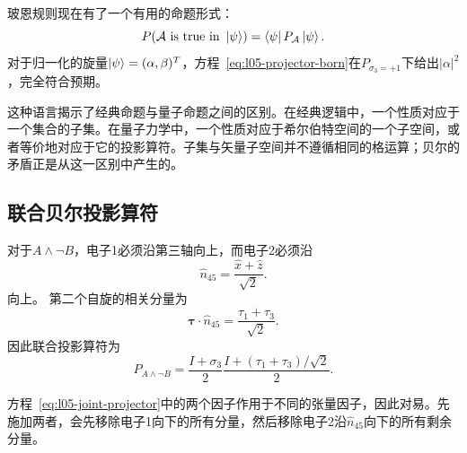 玻恩规则现在有了一个有用的命题形式：
\begin{equation}
  P(\mathcal A\text{ is true in }\left\lvert\psi\right\rangle)
  =
  \left\langle\psi\right\rvert P_{\mathcal A}\left\lvert\psi\right\rangle.
  \label{eq:l05-projector-born}
\end{equation}
对于归一化的旋量\(\left\lvert\psi\right\rangle=(\alpha,\beta)^T\)，方程~\eqref{eq:l05-projector-born}在\(P_{\sigma_3=+1}\)下给出\(|\alpha|^2\)，完全符合预期。

这种语言揭示了经典命题与量子命题之间的区别。在经典逻辑中，一个性质对应于一个集合的子集。在量子力学中，一个性质对应于希尔伯特空间的一个子空间，或者等价地对应于它的投影算符。子集与矢量子空间并不遵循相同的格运算；贝尔的矛盾正是从这一区别中产生的。

\subsection{联合贝尔投影算符}

对于\(A\wedge\neg B\)，电子1必须沿第三轴向上，而电子2必须沿
\begin{equation}
  \hat n_{45}=\frac{\hat x+\hat z}{\sqrt2}.
\end{equation}向上。
第二个自旋的相关分量为
\begin{equation}
  \boldsymbol{\tau}\cdot\hat n_{45}
  =
  \frac{\tau_1+\tau_3}{\sqrt2}.
\end{equation}
因此联合投影算符为
\begin{equation}
  P_{A\wedge\neg B}
  =
  \frac{I+\sigma_3}{2}
  \frac{I+(\tau_1+\tau_3)/\sqrt2}{2}.
  \label{eq:l05-joint-projector}
\end{equation}

\begin{classroomqa}
\end{classroomqa}

\begin{classroomqa}
\end{classroomqa}

方程~\eqref{eq:l05-joint-projector}中的两个因子作用于不同的张量因子，因此对易。先施加两者，会先移除电子1向下的所有分量，然后移除电子2沿\(\hat n_{45}\)向下的所有剩余分量。

